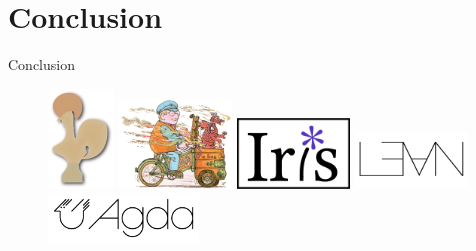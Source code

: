 \documentclass{beamer}
\theoremstyle{plain}
\begin{document}
\section{Conclusion}
\begin{frame}{Conclusion}
  \begin{figure}
    \includegraphics{coq} \includegraphics[width=3cm]{idris}
    \includegraphics[width=3cm]{iris} \includegraphics[width=3cm]{lean}
    \includegraphics[width=4cm]{agda} \centering
  \end{figure}
\end{frame}
\end{document}
